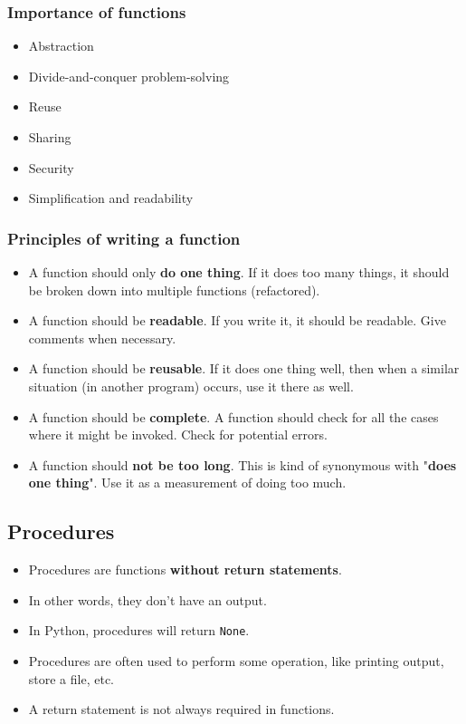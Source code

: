 \documentclass[11pt]{article}
\begin{document}
\subsubsection{Importance of functions}
\label{sec:org35e04bf}
\begin{itemize}
\item Abstraction
\item Divide-and-conquer problem-solving
\item Reuse
\item Sharing
\item Security
\item Simplification and readability
\end{itemize}

\subsubsection{Principles of writing a function}
\label{sec:org0905ef1}
\begin{itemize}
\item A function should only \textbf{do one thing}. If it does too many things, it should be broken down into multiple functions (refactored).
\item A function should be \textbf{readable}. If you write it, it should be readable. Give comments when necessary.
\item A function should be \textbf{reusable}. If it does one thing well, then when a similar situation (in another program) occurs, use it there as well.
\item A function should be \textbf{complete}. A function should check for all the cases where it might be invoked. Check for potential errors.
\item A function should \textbf{not be too long}. This is kind of synonymous with "\textbf{does one thing}". Use it as a measurement of doing too much.
\end{itemize}

\subsection{Procedures}
\label{sec:orgf256550}
\begin{itemize}
\item Procedures are functions \textbf{without return statements}.
\item In other words, they don't have an output.
\item In Python, procedures will return \texttt{None}.
\item Procedures are often used to perform some operation, like printing output, store a file, etc.
\item A return statement is not always required in functions.
\end{itemize}
\end{document}
